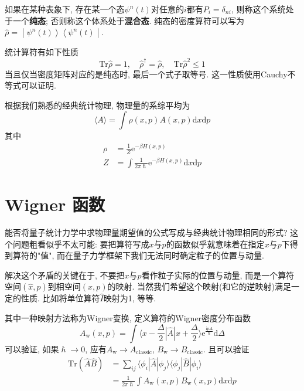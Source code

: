         如果在某种表象下, 存在某一个态$\psi^{n}(t)$对任意的$i$都有$P_i = \delta_{ni}$, 则称这个系统处于一个\textbf{纯态}; 否则称这个体系处于\textbf{混合态}.
        纯态的密度算符可以写为$\hat{\rho} = \left. \middle| {\psi^{n}(t)} \right\rangle \left\langle {\psi^{n}(t)} \middle| \right.$. 

        统计算符有如下性质
        \begin{equation}
            \mathrm{Tr}\hat\rho = 1, \quad
            \hat\rho^{\dagger} = \hat\rho, \quad
            \mathrm{Tr}\hat\rho^{2} \leq 1
        \end{equation}
        当且仅当密度矩阵对应的是纯态时, 最后一个式子取等号. 这一性质使用Cauchy不等式可以证明. 

        \splitline

        根据我们熟悉的经典统计物理, 物理量的系综平均为
        \begin{equation}
            \langle A \rangle = \int \rho(x,p) A(x,p) \mathrm{d}x\mathrm{d}p
        \end{equation}
        其中
        \begin{equation}\begin{aligned}
            \rho &= \frac 1Z \mathrm{e}^{-\beta H(x,p)}\\
            Z &= \int \frac 1{2\pi \hslash} \mathrm{e}^{-\beta H(x,p)} \mathrm{d}x \mathrm{d}p
        \end{aligned}\end{equation}

    \section{Wigner 函数}

        能否将量子统计力学中求物理量期望值的公式写成与经典统计物理相同的形式? 这个问题粗看似乎不太可能: 要把算符写成$x$与$p$的函数似乎就意味着在指定$x$与$p$下得到算符的"值", 而在量子力学框架下我们无法同时确定粒子的位置与动量. 
        
        解决这个矛盾的关键在于, 不要把$x$与$p$看作粒子实际的位置与动量, 而是一个算符空间$(\hat x, \hat p)$到相空间$(x, p)$的映射. 当然我们希望这个映射(和它的逆映射)满足一定的性质. 比如将单位算符$\hat I$映射为1, 等等.

        其中一种映射方法称为Wigner变换, 定义算符的Wigner密度分布函数
        \begin{equation}
            A_\mathrm{w}(x,p) = \int \langle x - \frac {\Delta}2 | \hat{A} | x + \frac {\Delta}2 \rangle \mathrm{e}^{\frac {\mathrm{i} p \Delta}{\hslash}} \mathrm{d} \Delta
        \end{equation}
        可以验证, 如果$\hslash \to 0$, 应有$A_\mathrm{w} \to A_\mathrm{classic}$, $B_\mathrm{w} \to B_\mathrm{classic}$. 且可以验证
        \begin{equation}\begin{aligned}
            \mathrm{Tr} (\hat{A}\hat{B}) &= \sum_{ij} \langle \phi_{i} | \hat{A} | \phi_{j} \rangle \langle \phi_{j} | \hat{B} | \phi_{i} \rangle \\
            &= \frac 1{2\pi\hslash} \int A_\mathrm{w}(x,p) B_\mathrm{w}(x,p) \mathrm{d}x \mathrm{d}p
        \end{aligned}\end{equation}

